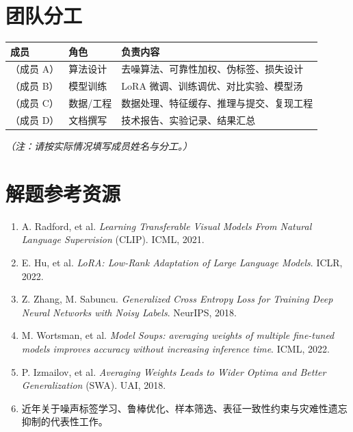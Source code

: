 \documentclass[11pt]{ctexart}
\newcommand{\kw}[1]{\textbf{#1}}
\begin{document}
\section{团队分工}
\begin{center}
\begin{tabular}{@{}p{3.2cm}p{3.0cm}p{8.2cm}@{}}
\toprule
\kw{成员} & \kw{角色} & \kw{负责内容} \\
\midrule
（成员 A） & 算法设计 & 去噪算法、可靠性加权、伪标签、损失设计 \\
（成员 B） & 模型训练 & LoRA 微调、训练调优、对比实验、模型汤 \\
（成员 C） & 数据/工程 & 数据处理、特征缓存、推理与提交、复现工程 \\
（成员 D） & 文档撰写 & 技术报告、实验记录、结果汇总 \\
\bottomrule
\end{tabular}
\end{center}
\textit{（注：请按实际情况填写成员姓名与分工。）}

\section{解题参考资源}
\begin{enumerate}[leftmargin=2em,itemsep=1pt]
  \item A. Radford, et al. \textit{Learning Transferable Visual Models From Natural Language Supervision} (CLIP). ICML, 2021.
  \item E. Hu, et al. \textit{LoRA: Low-Rank Adaptation of Large Language Models}. ICLR, 2022.
  \item Z. Zhang, M. Sabuncu. \textit{Generalized Cross Entropy Loss for Training Deep Neural Networks with Noisy Labels}. NeurIPS, 2018.
  \item M. Wortsman, et al. \textit{Model Soups: averaging weights of multiple fine-tuned models improves accuracy without increasing inference time}. ICML, 2022.
  \item P. Izmailov, et al. \textit{Averaging Weights Leads to Wider Optima and Better Generalization} (SWA). UAI, 2018.
  \item 近年关于噪声标签学习、鲁棒优化、样本筛选、表征一致性约束与灾难性遗忘抑制的代表性工作。
\end{enumerate}
\end{document}
